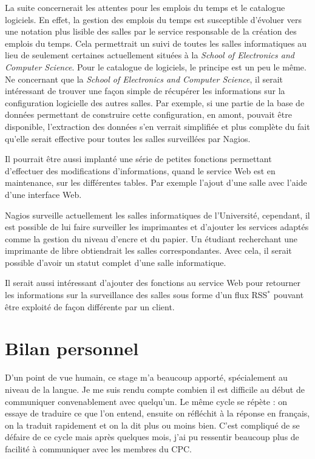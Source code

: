 La suite concernerait les attentes pour les emplois du temps et le catalogue logiciels.
En effet, la gestion des emplois du temps est susceptible d'\'evoluer vers une notation plus lisible des salles par le service responsable de la cr\'eation des emplois du temps.
Cela permettrait un suivi de toutes les salles informatiques au lieu de seulement certaines actuellement situ\'ees \`a la \textit{School of Electronics and Computer Science}.
Pour le catalogue de logiciels, le principe est un peu le m\^eme.
Ne concernant que la \textit{School of Electronics and Computer Science}, il serait int\'eressant de trouver une fa\c{c}on simple de r\'ecup\'erer les informations sur la configuration logicielle des autres salles.
Par exemple, si une partie de la base de donn\'ees permettant de construire cette configuration, en amont, pouvait \^etre disponible, l'extraction des donn\'ees s'en verrait simplifi\'ee et plus compl\`ete du fait qu'elle serait effective pour toutes les salles surveill\'ees par Nagios.

Il pourrait \^etre aussi implant\'e une s\'erie de petites fonctions permettant d'effectuer des modifications d'informations, quand le service Web est en maintenance, sur les diff\'erentes tables.
Par exemple l'ajout d'une salle avec l'aide d'une interface Web.

Nagios surveille actuellement les salles informatiques de l'Universit\'e, cependant, il est possible de lui faire surveiller les imprimantes et d'ajouter les services adapt\'es comme la gestion du niveau d'encre et du papier.
Un \'etudiant recherchant une imprimante de libre obtiendrait les salles correspondantes.
Avec cela, il serait possible d'avoir un statut complet d'une salle informatique.

Il serait aussi int\'eressant d'ajouter des fonctions au service Web pour retourner les informations sur la surveillance des salles sous forme d'un flux RSS$^*$ pouvant \^etre exploit\'e de fa\c{c}on diff\'erente par un client.


\section{Bilan personnel}

D'un point de vue humain, ce stage m'a beaucoup apport\'e, sp\'ecialement au niveau de la langue.
Je me suis rendu compte combien il est difficile au d\'ebut de communiquer convenablement avec quelqu'un.
Le m\^eme cycle se r\'ep\`ete : on essaye de traduire ce que l'on entend, ensuite on r\'efl\'echit \`a la r\'eponse en fran\c{c}ais, on la traduit rapidement et on la dit plus ou moins bien.
C'est compliqu\'e de se d\'efaire de ce cycle mais apr\`es quelques mois, j'ai pu ressentir beaucoup plus de facilit\'e \`a communiquer avec les membres du CPC.

